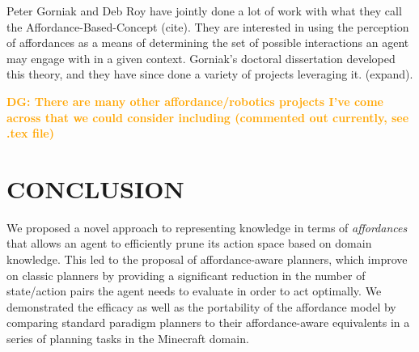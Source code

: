 \documentclass[]{article}
\newcommand{\dgnote}[1]{\textcolor{Orange}{\textbf{DG: #1}}}
\begin{document}
Peter Gorniak and Deb Roy have jointly done a lot of work with what they call the Affordance-Based-Concept (cite). They are interested
in using the perception of affordances as a means of determining the set of possible interactions an agent may engage with in a given context.
Gorniak's doctoral dissertation developed this theory, and they have since done a variety of projects leveraging it. (expand).

\dgnote{There are many other affordance/robotics projects I've come across that we could consider including (commented out currently, see .tex file)}


\section{CONCLUSION}

We proposed a novel approach to representing knowledge in terms of
{\em affordances}~\citep{gibson77} that allows an agent to efficiently
prune its action space based on domain knowledge. This led to the 
proposal of affordance-aware planners, which improve on classic planners
by providing a significant reduction in the number of state/action pairs the
agent needs to evaluate in order to act optimally. We demonstrated the efficacy 
as well as the portability of the affordance model by comparing standard paradigm
planners to their affordance-aware equivalents in a series of planning tasks in the Minecraft
domain.
\end{document}
